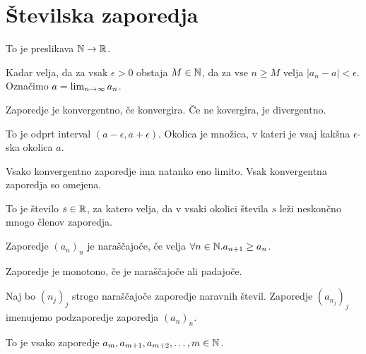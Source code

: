 \section{Številska zaporedja}


To je preslikava $\mathbb{N} \to \mathbb{R}$.


Kadar velja, da za vsak $\epsilon > 0$ obstaja $M \in \mathbb{N}$, da za vse $n \ge M$ velja $|a_n - a| < \epsilon$. Označimo $a = \lim_{n\to \infty} a_n$.


Zaporedje je konvergentno, če konvergira. Če ne kovergira, je divergentno.


To je odprt interval $(a-\epsilon, a+\epsilon)$. Okolica je množica, v kateri je vsaj kakšna $\epsilon$-ska okolica $a$.


Vsako konvergentno zaporedje ima natanko eno limito. Vsak konvergentna zaporedja so omejena.


To je število $s \in \mathbb{R}$, za katero velja, da v vsaki okolici števila $s$ leži neskončno mnogo členov zaporedja.


Zaporedje $(a_n)_n$ je naraščajoče, če velja $\forall n \in \mathbb{N} . a_{n+1} \ge a_n$.

Zaporedje je monotono, če je naraščajoče ali padajoče.


Naj bo $(n_j)_j$ strogo naraščajoče zaporedje naravnih števil. Zaporedje $(a_{n_j})_j$ imenujemo podzaporedje zaporedja $(a_n)_n$.


To je vsako zaporedje $a_m, a_{m+1}, a_{m+2}, \ldots, m \in \mathbb{N}$.


